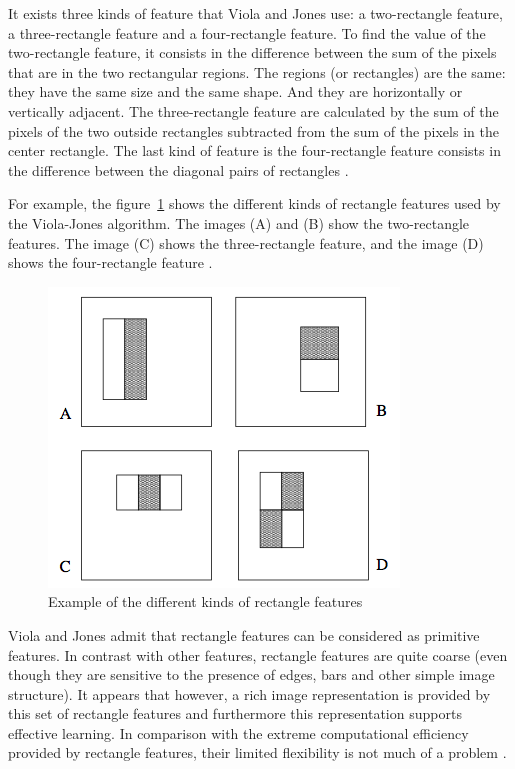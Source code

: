 \noindent It exists three kinds of feature that Viola and Jones use: a two-rectangle feature, a three-rectangle feature and a four-rectangle feature. To find the value of the two-rectangle feature, it consists in the difference between the sum of the pixels that are in the two rectangular regions. The regions (or rectangles) are the same: they have the same size and the same shape. And they are horizontally or vertically adjacent. The three-rectangle feature are calculated by the sum of the pixels of the two outside rectangles subtracted from the sum of the pixels in the center rectangle. The last kind of feature is the four-rectangle feature consists in the difference between the diagonal pairs of rectangles \cite{VIO01}.
\newline

\noindent For example, the figure~\ref{haar_feature_description} shows the different kinds of rectangle features used by the Viola-Jones algorithm. The images (A) and (B) show the two-rectangle features. The image (C) shows the three-rectangle feature, and the image (D) shows the four-rectangle feature \cite{VIO01}.
\newline

\begin{figure}[!h]
\begin{center}
\noindent \includegraphics[scale=0.6]{figures/haar_feature_description} 
\newline
\caption{Example of the different kinds of rectangle features}
\label{haar_feature_description}
\end{center} 
\end{figure}

\noindent Viola and Jones admit that rectangle features can be considered as primitive features. In contrast with other features, rectangle features are quite coarse (even though they are sensitive to the presence of edges, bars and other simple image structure). It appears that however, a rich image representation is provided by this set of rectangle features and furthermore this representation supports effective learning. In comparison with the extreme computational efficiency provided by rectangle features, their limited flexibility is not much of a problem \cite{VIO01}.
\newline

